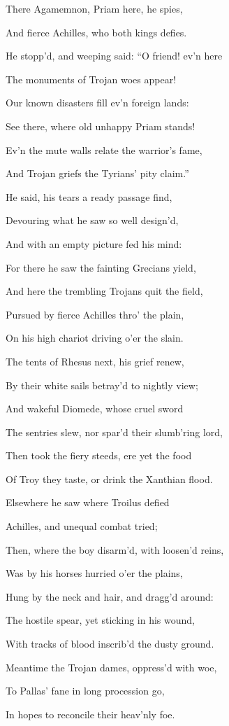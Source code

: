 There Agamemnon, Priam here, he spies,

And fierce Achilles, who both kings defies.

He stopp’d, and weeping said: “O friend! ev’n here

The monuments of Trojan woes appear!

Our known disasters fill ev’n foreign lands:

See there, where old unhappy Priam stands!

Ev’n the mute walls relate the warrior’s fame,

And Trojan griefs the Tyrians’ pity claim.”

He said, his tears a ready passage find,

Devouring what he saw so well design’d,

And with an empty picture fed his mind:

For there he saw the fainting Grecians yield,

And here the trembling Trojans quit the field,

Pursued by fierce Achilles thro’ the plain,

On his high chariot driving o’er the slain.

The tents of Rhesus next, his grief renew,

By their white sails betray’d to nightly view;

And wakeful Diomede, whose cruel sword

The sentries slew, nor spar’d their slumb’ring lord,

Then took the fiery steeds, ere yet the food

Of Troy they taste, or drink the Xanthian flood.

Elsewhere he saw where Troilus defied

Achilles, and unequal combat tried;

Then, where the boy disarm’d, with loosen’d reins,

Was by his horses hurried o’er the plains,

Hung by the neck and hair, and dragg’d around:

The hostile spear, yet sticking in his wound,

With tracks of blood inscrib’d the dusty ground.

Meantime the Trojan dames, oppress’d with woe,

To Pallas’ fane in long procession go,

In hopes to reconcile their heav’nly foe.

